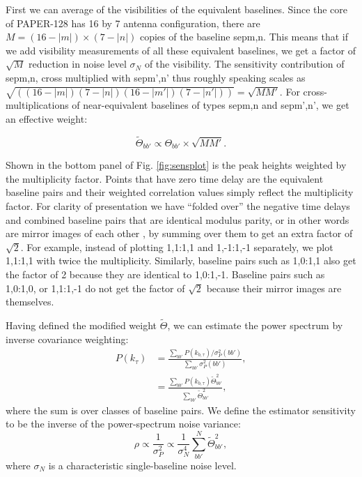 \documentclass[twocolumn,apj,numberedappendix]{emulateapj}
\renewcommand\[{\begin{equation}}
\renewcommand\]{\end{equation}}
\begin{document}
First we can average of the visibilities of the equivalent baselines. Since the core of PAPER-128 has 16 by 7 antenna configuration, there
are $M=(16-|m|)\times(7-|n|)$ copies of the baseline sepm,n. This means
that if we add visibility measurements of all these equivalent baselines,
we get a factor of $\sqrt{M}$ reduction in noise
level $\sigma_N$ of the visibility. The sensitivity contribution of sepm,n, cross multiplied with sepm',n'  thus roughly speaking scales as $\sqrt{\left((16-|m|)(7-|n|)(16-|m'|)(7-|n'|)\right)}=\sqrt{MM'}$.
For cross-multiplications of near-equivalent baselines of
types sepm,n and sepm',n', we get an effective weight: 

\begin{equation}
\widetilde{\Theta}_{bb'} \propto \Theta_{bb'}\times\sqrt{MM'}.\label{eq:sensul}
\end{equation}

Shown in the bottom panel of Fig. \ref{fig:sensplot} is the peak heights weighted
by the multiplicity factor. Points that have zero time delay are the equivalent baseline pairs and their weighted correlation values simply reflect the multiplicity factor. For clarity of presentation we have ``folded over'' the negative time delays and combined baseline pairs that are identical modulus parity, 
or in other words are mirror images of each other
, by summing over them to get an extra factor of $\sqrt{2}$. For example, 
instead of plotting 1,1:1,1 and 1,-1:1,-1 separately, we plot 1,1:1,1 with twice the multiplicity. Similarly, baseline pairs such as 
1,0:1,1 also get the factor of 2 because they are identical to 1,0:1,-1. Baseline pairs such as 1,0:1,0, or 1,1:1,-1 do not get
the factor of $\sqrt{2}$ because their mirror images are themselves. 




Having defined the modified weight $\widetilde{\Theta}$, we can estimate the power spectrum by inverse covariance weighting:
\begin{equation}
\begin{aligned}
 P(k_{\tau}) &= \frac{\sum_{bb'}P(k_{b,\tau})/\sigma_P^2(bb')}{\sum_{bb'}\sigma_P^2(bb')}, \\
 &= \frac{\sum_{bb'}P(k_{b,\tau})\widetilde{\Theta}_{bb'}^2}{\sum_{bb'}\widetilde{\Theta}_{bb'}^2},
 \end{aligned}
\end{equation}
where the sum is over classes of baseline pairs. 
We define the estimator sensitivity to be the inverse of the power-spectrum noise variance:
\begin{equation}
\rho \propto \frac{1}{\sigma_P^2} \propto \frac{1}{\sigma^4_N}\sum_{bb'}^N\widetilde{\Theta}^2_{bb'},
\end{equation}
where $\sigma_N$ is a characteristic single-baseline noise level. 
\end{document}
